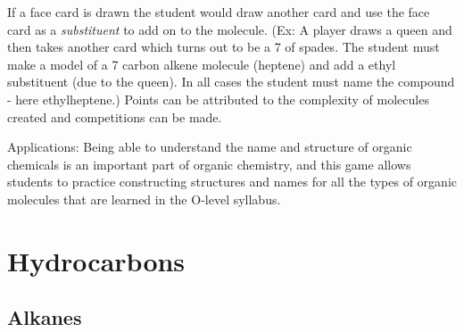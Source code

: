 \begin{multicols}{2}
\begin{description*}
{If a face card is drawn the student would draw another card and use the face card as a \emph{substituent} to add on to the molecule. (Ex: A player draws a queen and then takes another card which turns out to be a 7 of spades. The student must make a model of a 7 carbon alkene molecule (heptene) and add a ethyl substituent (due to the queen). In all cases the student must name the compound - here ethylheptene.) Points can be attributed to the complexity of molecules created and competitions can be made.}
\item[Applications:]{Being able to understand the name and structure of organic chemicals is an important part of organic chemistry, and this game allows students to practice constructing structures and names for all the types of organic molecules that are learned in the O-level syllabus.}
\end{description*}

\columnbreak


\section*{Hydrocarbons} 


\subsection{Alkanes} 



\end{multicols}
